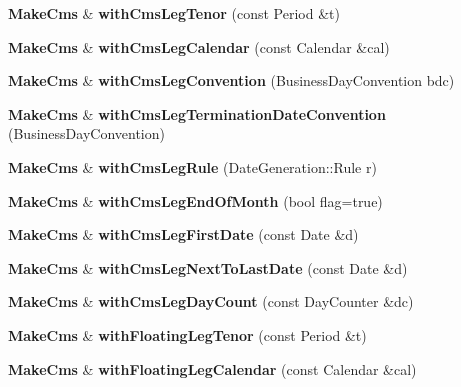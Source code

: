 \begin{DoxyCompactItemize}
\item 
{\bf Make\+Cms} \& {\bfseries with\+Cms\+Leg\+Tenor} (const Period \&t)\label{class_quant_lib_1_1_make_cms_ad45ceff08e135f1525d7e6b1ee4d4cdf}

\item 
{\bf Make\+Cms} \& {\bfseries with\+Cms\+Leg\+Calendar} (const Calendar \&cal)\label{class_quant_lib_1_1_make_cms_ab49f2544011b42004b4f5523ab524322}

\item 
{\bf Make\+Cms} \& {\bfseries with\+Cms\+Leg\+Convention} (Business\+Day\+Convention bdc)\label{class_quant_lib_1_1_make_cms_a6811faad6e314ca9e2b404bbf96c6754}

\item 
{\bf Make\+Cms} \& {\bfseries with\+Cms\+Leg\+Termination\+Date\+Convention} (Business\+Day\+Convention)\label{class_quant_lib_1_1_make_cms_a095a59d3a812e5d061d21682a7cf54bd}

\item 
{\bf Make\+Cms} \& {\bfseries with\+Cms\+Leg\+Rule} (Date\+Generation\+::\+Rule r)\label{class_quant_lib_1_1_make_cms_aeb1ca009e2175830ad8770926669e365}

\item 
{\bf Make\+Cms} \& {\bfseries with\+Cms\+Leg\+End\+Of\+Month} (bool flag=true)\label{class_quant_lib_1_1_make_cms_a5ee8f35f7555312bb51c5401df74192e}

\item 
{\bf Make\+Cms} \& {\bfseries with\+Cms\+Leg\+First\+Date} (const Date \&d)\label{class_quant_lib_1_1_make_cms_a57ac0b95f9028bd3df922507eed49f12}

\item 
{\bf Make\+Cms} \& {\bfseries with\+Cms\+Leg\+Next\+To\+Last\+Date} (const Date \&d)\label{class_quant_lib_1_1_make_cms_a526ec2003ac0e2026f7e7af45b1b70a0}

\item 
{\bf Make\+Cms} \& {\bfseries with\+Cms\+Leg\+Day\+Count} (const Day\+Counter \&dc)\label{class_quant_lib_1_1_make_cms_a615d1891d9916774b6b29842d77d3a1a}

\item 
{\bf Make\+Cms} \& {\bfseries with\+Floating\+Leg\+Tenor} (const Period \&t)\label{class_quant_lib_1_1_make_cms_a454082b9f13356b3a73e32ac6c9a93e6}

\item 
{\bf Make\+Cms} \& {\bfseries with\+Floating\+Leg\+Calendar} (const Calendar \&cal)\label{class_quant_lib_1_1_make_cms_af404bba37a63bdf083d8a49f65ac8674}


\end{DoxyCompactItemize}
